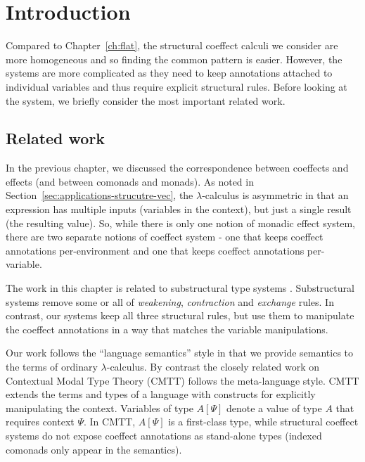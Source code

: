\section{Introduction}
\label{sec:structural-intro}

Compared to Chapter~\ref{ch:flat}, the structural coeffect calculi we consider are more homogeneous
and so finding the common pattern is easier. However, the systems are more complicated as they need
to keep annotations attached to individual variables and thus require explicit structural rules.
Before looking at the system, we briefly consider the most important related work.


\subsection{Related work}

In the previous chapter, we discussed the correspondence between coeffects and effects (and
between comonads and monads). As noted in Section~\ref{sec:applications-strucutre-vec}, the
$\lambda$-calculus is asymmetric in that an expression has multiple inputs (variables in the
context), but just a single result (the resulting value). So, while there is only one notion of
monadic effect system, there are two separate notions of coeffect system - one that keeps coeffect
annotations per-environment and one that keeps coeffect annotations per-variable.

The work in this chapter is related to substructural type systems \cite{substruct-attpl-intro}.
Substructural systems remove some or all of \emph{weakening}, \emph{contraction} and
\emph{exchange} rules. In contrast, our systems keep all three structural rules, but use them to
manipulate the coeffect annotations in a way that matches the variable manipulations.

Our work follows the ``language semantics'' style in that we provide semantics to the terms of
ordinary $\lambda$-calculus. By contrast the closely related work on Contextual Modal
Type Theory (CMTT) \cite{logic-cmtt} follows the meta-language style. CMTT extends the terms and
types of a language with constructs for explicitly manipulating the context. Variables
of type $A[\Psi]$ denote a value of type $A$ that requires context $\Psi$. In CMTT,
$A[\Psi]$ is a first-class type, while structural coeffect systems do not expose coeffect
annotations as stand-alone types (indexed comonads only appear in the semantics).

